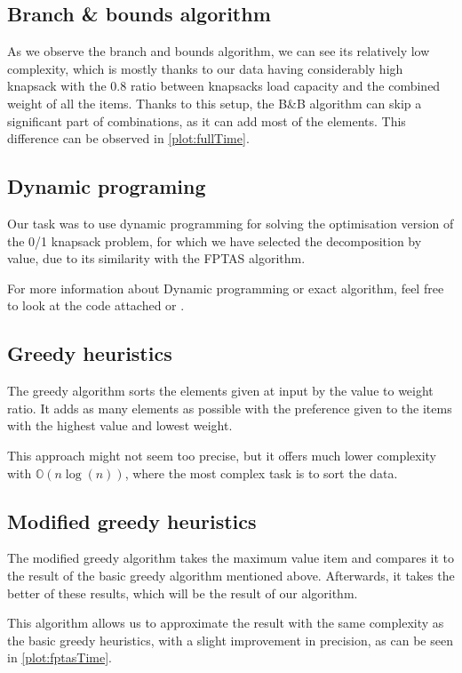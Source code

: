 \subsection{Branch \& bounds algorithm}
As we observe the branch and bounds algorithm, we can see its relatively low complexity, which is mostly thanks to our data having considerably high knapsack with the 0.8 ratio between knapsacks load capacity and the combined weight of all the items. Thanks to this setup, the B\&B algorithm can skip a significant part of combinations, as it can add most of the elements. This difference can be observed in \cref{plot:fullTime}.

\subsection{Dynamic programing}
Our task was to use dynamic programming for solving the optimisation version of the 0/1 knapsack problem, for which we have selected the decomposition by value, due to its similarity with the FPTAS algorithm.

For more information about Dynamic programming or exact algorithm, feel free to look at the code attached or \cite[Moodle textbook]{WEBSITE:dynamicKnapsack}.

\subsection{Greedy heuristics}
The greedy algorithm sorts the elements given at input by the value to weight ratio. It adds as many elements as possible with the preference given to the items with the highest value and lowest weight.

This approach might not seem too precise, but it offers much lower complexity with $\mathbb{O}(n \log(n))$, where the most complex task is to sort the data.

\subsection{Modified greedy heuristics}
The modified greedy algorithm takes the maximum value item and compares it to the result of the basic greedy algorithm mentioned above. Afterwards, it takes the better of these results, which will be the result of our algorithm.

This algorithm allows us to approximate the result with the same complexity as the basic greedy heuristics, with a slight improvement in precision, as can be seen in \cref{plot:fptasTime}.


